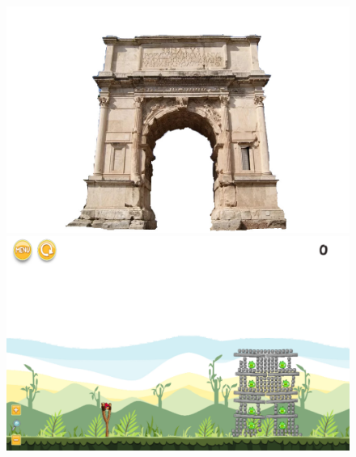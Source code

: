 \documentclass{dalthesis}
\begin{document}
\begin{figure}
  \includegraphics[width=\textwidth,height=\textheight,keepaspectratio]{levels/pictures/buildings/triumphal_arch.jpg}
  \includegraphics[width=\textwidth,height=\textheight,keepaspectratio]{levels/screenshots/buildings/triumphal_arch.png}
\end{figure}
\end{document}
